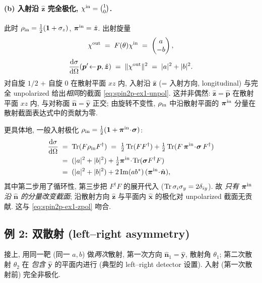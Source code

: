 \paragraph{(b) 入射沿 $\hat{\bm z}$ 完全极化, $\chi^{\rm in}=\binom{1}{0}$.} 此时 $\rho_{\rm in}=\tfrac12(\mathbf 1+\sigma_z)$, $\bm\pi^{\rm in}=\hat{\bm z}$. 出射旋量
\begin{equation}
  \chi^{\rm out}\;=\;F(\theta)\chi^{\rm in}\;=\;\begin{pmatrix}a\\-b\end{pmatrix},
\end{equation}
\begin{equation}
  \frac{\mathrm{d}\sigma}{\mathrm{d}\Omega}(\bm p'\!\leftarrow\!\bm p,\hat{\bm z})\;=\;\|\chi^{\rm out}\|^2\;=\;|a|^2+|b|^2.
  \label{eq:spin2p-ex1-zpol}
\end{equation}
对自旋 $1/2$ + 自旋 $0$ 在散射平面 $xz$ 内, 入射沿 $\hat{\bm z}$ (= 入射方向, longitudinal) 与完全 unpolarized 给出\emph{相同}的截面 \eqref{eq:spin2p-ex1-unpol}. 这并非偶然: $\hat{\bm z}=\hat{\bm p}$ 在散射平面 $xz$ 内, 与对称面 $\hat{\bm n}=\hat{\bm y}$ 正交; 由旋转不变性, $\rho_{\rm in}$ 中沿散射平面的 $\bm\pi^{\rm in}$ 分量在散射截面表达式中的贡献为零.

更具体地, 一般入射极化 $\rho_{\rm in}=\tfrac12(\mathbf 1+\bm\pi^{\rm in}\!\cdot\!\bm\sigma)$:
\begin{align}
  \frac{\mathrm{d}\sigma}{\mathrm{d}\Omega}\;
  &=\;\operatorname{Tr}(F\rho_{\rm in}F^\dagger)\;=\;\tfrac12\operatorname{Tr}(FF^\dagger)+\tfrac12\operatorname{Tr}(F\,\bm\pi^{\rm in}\!\cdot\!\bm\sigma\,F^\dagger)\nonumber\\
  &=\;(|a|^2+|b|^2)+\tfrac12\bm\pi^{\rm in}\!\cdot\!\operatorname{Tr}(\bm\sigma F^\dagger F)\nonumber\\
  &=\;(|a|^2+|b|^2)+ 2\Im(ab^*)\,(\bm\pi^{\rm in}\!\cdot\!\hat{\bm n}),
  \label{eq:spin2p-ex1-general}
\end{align}
其中第二步用了循环性, 第三步把 $F^\dagger F$ 的展开代入 ($\operatorname{Tr}\sigma_i\sigma_y=2\delta_{iy}$). 故 \emph{只有 $\bm\pi^{\rm in}$ 沿 $\hat{\bm n}$ 的分量改变截面}; 沿散射方向 $\hat{\bm z}$ 与平面内 $\hat{\bm x}$ 的极化对 unpolarized 截面无贡献. 这与 \eqref{eq:spin2p-ex1-zpol} 吻合.

\subsection{例 2: 双散射 (left--right asymmetry)}\label{sec:spin2p-ex2}

接上, 用同一靶 (同一 $a,b$) 做\emph{两次}散射, 第一次方向 $\hat{\bm n}_1=\hat{\bm y}$, 散射角 $\theta_1$; 第二次散射 $\theta_2$ 在 \emph{包含 $\hat{\bm y}$} 的平面内进行 (典型的 left--right detector 设置). 入射 (第一次散射前) 完全非极化.

